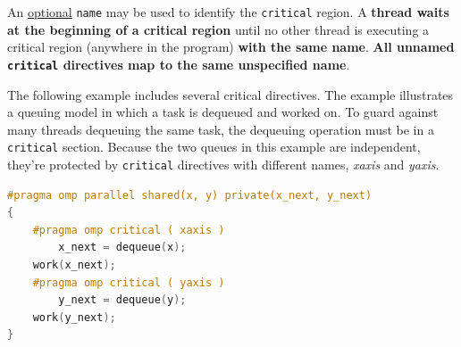 \noindent
An \underline{optional} \texttt{name} may be used to identify the \texttt{critical} region. A \textbf{thread waits at the beginning of a critical region} until no other thread is executing a critical region (anywhere in the program) \textbf{with the same name}. \textbf{All unnamed \texttt{critical} directives map to the same unspecified name}.

\begin{examplebox}
    The following example includes several critical directives. The example illustrates a queuing model in which a task is dequeued and worked on. To guard against many threads dequeuing the same task, the dequeuing operation must be in a \texttt{critical} section. Because the two queues in this example are independent, they're protected by \texttt{critical} directives with different names, \emph{xaxis} and \emph{yaxis}.\cite{openMPCriticalDirectiveMicrosoftExample}
    \begin{lstlisting}[language=C++]
#pragma omp parallel shared(x, y) private(x_next, y_next)
{
    #pragma omp critical ( xaxis )
        x_next = dequeue(x);
    work(x_next);
    #pragma omp critical ( yaxis )
        y_next = dequeue(y);
    work(y_next);
}
    \end{lstlisting}
\end{examplebox}

